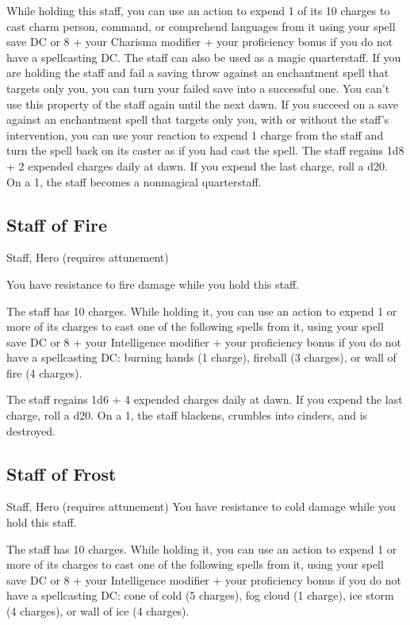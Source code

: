 While holding this staff, you can use an action to expend 1 of its 10 charges to cast charm person, command, or comprehend languages from it using your spell save DC or 8 + your Charisma modifier + your proficiency bonus if you do not have a spellcasting DC. The staff can also be used as a magic quarterstaff. If you are holding the staff and fail a saving throw against an enchantment spell that targets only you, you can turn your failed save into a successful one. You can't use this property of the staff again until the next dawn. If you succeed on a save against an enchantment spell that targets only you, with or without the staff's intervention, you can use your reaction to expend 1 charge from the staff and turn the spell back on its caster as if you had cast the spell.  The staff regains 1d8 + 2 expended charges daily at dawn. If you expend the last charge, roll a d20. On a 1, the staff becomes a nonmagical quarterstaff.

\subsection{Staff of Fire}
Staff, Hero (requires attunement)

You have resistance to fire damage while you hold this staff.

The staff has 10 charges. While holding it, you can use an action to expend 1 or more of its charges to cast one of the following spells from it, using your spell save DC or 8 + your Intelligence modifier + your proficiency bonus if you do not have a spellcasting DC: burning hands (1 charge), fireball (3 charges), or wall of fire (4 charges).

The staff regains 1d6 + 4 expended charges daily at dawn. If you expend the last charge, roll a d20. On a 1, the staff blackens, crumbles into cinders, and is destroyed.

\subsection{Staff of Frost}
Staff, Hero (requires attunement)
You have resistance to cold damage while you hold this staff.

The staff has 10 charges. While holding it, you can use an action to expend 1 or more of its charges to cast one of the following spells from it, using your spell save DC or 8 + your Intelligence modifier + your proficiency bonus if you do not have a spellcasting DC: cone of cold (5 charges), fog cloud (1 charge), ice storm (4 charges), or wall of ice (4 charges).

